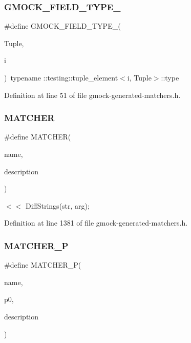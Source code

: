 \subsubsection{\texorpdfstring{G\+M\+O\+C\+K\+\_\+\+F\+I\+E\+L\+D\+\_\+\+T\+Y\+P\+E\+\_\+}{GMOCK\_FIELD\_TYPE\_}}
{\footnotesize\ttfamily \#define G\+M\+O\+C\+K\+\_\+\+F\+I\+E\+L\+D\+\_\+\+T\+Y\+P\+E\+\_\+(\begin{DoxyParamCaption}\item[{}]{Tuple,  }\item[{}]{i }\end{DoxyParamCaption})~typename \+::testing\+::tuple\+\_\+element$<$i, Tuple$>$\+::type}



Definition at line 51 of file gmock-\/generated-\/matchers.\+h.

\mbox{\label{gmock-generated-matchers_8h_af4fe73ff8e2b0494f4970b575b65ddff}} 
\subsubsection{\texorpdfstring{M\+A\+T\+C\+H\+ER}{MATCHER}}
{\footnotesize\ttfamily \#define M\+A\+T\+C\+H\+ER(\begin{DoxyParamCaption}\item[{}]{name,  }\item[{}]{description }\end{DoxyParamCaption})}



$<$$<$ Diff\+Strings(str, arg); 



Definition at line 1381 of file gmock-\/generated-\/matchers.\+h.

\mbox{\label{gmock-generated-matchers_8h_acb7ae915efa2fd8d3f6ea7313198afb6}} 
\subsubsection{\texorpdfstring{M\+A\+T\+C\+H\+E\+R\+\_\+P}{MATCHER\_P}}
{\footnotesize\ttfamily \#define M\+A\+T\+C\+H\+E\+R\+\_\+P(\begin{DoxyParamCaption}\item[{}]{name,  }\item[{}]{p0,  }\item[{}]{description }\end{DoxyParamCaption})}



